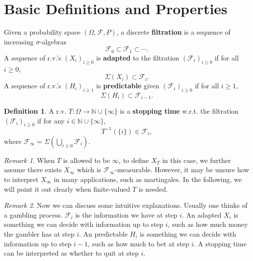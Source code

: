 \documentclass[openany]{book}
\theoremstyle{definition}
\newtheorem{definition}{Definition}[chapter]
\theoremstyle{remark}
\newtheorem*{remark}{Remark}
\begin{document}
\section{Basic Definitions and Properties}
Given a probability space $(\Omega,\mathcal{F},P)$, a discrete \textbf{filtration} is a sequence of increasing $\sigma$-algebras
\begin{equation*}
    \mathcal{F}_0\subset \mathcal{F}_1\subset\cdots.
\end{equation*}
A sequence of r.v.'s $(X_i)_{i\ge0}$ is \textbf{adapted} to the filtration $(\mathcal{F}_i)_{i\ge0}$ if for all $i\ge0$,
\begin{equation*}
    \Sigma(X_i)\subset \mathcal{F}_i.
\end{equation*}
A sequence of r.v.'s $(H_i)_{i\ge1}$ is \textbf{predictable} given $(\mathcal{F}_i)_{i\ge0}$ if for all $i\ge1$,
\begin{equation*}
    \Sigma(H_i)\subset \mathcal{F}_{i-1}.
\end{equation*}
\begin{definition}
    A r.v. $T:\Omega\to \mathbb{N}\cup\{\infty\}$ is a \textbf{stopping time} w.r.t. the filtration $(\mathcal{F}_i)_{i\ge0}$ if for any $i\in \mathbb{N}\cup\{\infty\}$,
    \begin{equation*}
        T^{-1}\left(\{i\}\right)\in \mathcal{F}_i,
    \end{equation*}
    where $\mathcal{F}_{\infty}=\Sigma\left(\bigcup_{i\ge0}\mathcal{F}_i\right)$.
\end{definition}
\begin{remark}
    When $T$ is allowed to be $\infty$, to define $X_T$ in this case, we further assume there exists $X_{\infty}$ which is $\mathcal{F}_{\infty}$-measurable. However, it may be unsure how to interpret $X_{\infty}$ in many applications, such as martingales. In the following, we will point it out clearly when finite-valued $T$ is needed.
\end{remark}
\begin{remark}
    Now we can discuss some intuitive explanations. Usually one thinks of a gambling process. $\mathcal{F}_i$ is the information we have at step $i$. An adapted $X_i$ is something we can decide with information up to step $i$, such as how much money the gambler has at step $i$. An predictable $H_i$ is something we can decide with information up to step $i-1$, such as how much to bet at step $i$. A stopping time can be interpreted as whether to quit at step $i$.
\end{remark}
\end{document}
